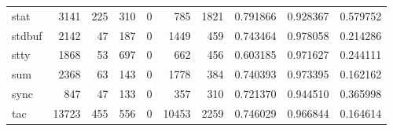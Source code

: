 \begin{longtable}{lrrrrrrrrr}
stat      &                                3141 &                                             225 &                                            310 &                                             0 &                                            785 &                                         1821 &                                           0.791866 &                               0.928367 &                             0.579752 \\
stdbuf    &                                2142 &                                              47 &                                            187 &                                             0 &                                           1449 &                                          459 &                                           0.743464 &                               0.978058 &                             0.214286 \\
stty      &                                1868 &                                              53 &                                            697 &                                             0 &                                            662 &                                          456 &                                           0.603185 &                               0.971627 &                             0.244111 \\
sum       &                                2368 &                                              63 &                                            143 &                                             0 &                                           1778 &                                          384 &                                           0.740393 &                               0.973395 &                             0.162162 \\
sync      &                                 847 &                                              47 &                                            133 &                                             0 &                                            357 &                                          310 &                                           0.721370 &                               0.944510 &                             0.365998 \\
tac       &                               13723 &                                             455 &                                            556 &                                             0 &                                          10453 &                                         2259 &                                           0.746029 &                               0.966844 &                             0.164614 \\

\end{longtable}
